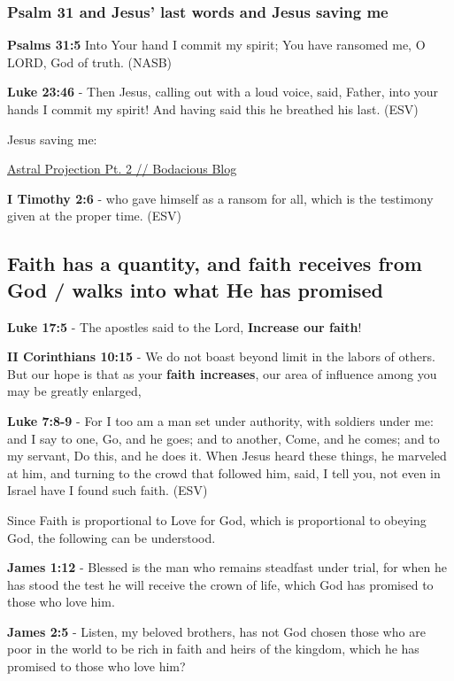 \documentclass[11pt]{article}
\begin{document}
\subsubsection{Psalm 31 and Jesus' last words and Jesus saving me}
\label{sec:org4863b66}

\textbf{Psalms 31:5}  Into Your hand I commit my spirit; You have ransomed me, O LORD, God of truth.  (NASB)

\textbf{Luke 23:46} - Then Jesus, calling out with a loud voice, said, Father, into your hands I commit my spirit! And having said this he breathed his last.  (ESV)

Jesus saving me:

\href{https://web.archive.org/web/20220402091720/https://mullikine.github.io/posts/astral-projection-pt-2/}{Astral Projection Pt. 2 // Bodacious Blog}

\textbf{I Timothy 2:6} - who gave himself as a ransom for all, which is the testimony given at the proper time. (ESV)

\subsection{Faith has a quantity, and faith receives from God / walks into what He has promised}
\label{sec:org058a643}
\textbf{Luke 17:5} - The apostles said to the Lord, \textbf{Increase our faith}!

\textbf{II Corinthians 10:15} - We do not boast beyond limit in the labors of others. But our hope is that as your \textbf{faith increases}, our area of influence among you may be greatly enlarged,

\textbf{Luke 7:8-9} - For I too am a man set under authority, with soldiers under me: and I say to one, Go, and he goes; and to another, Come, and he comes; and to my servant, Do this, and he does it. When Jesus heard these things, he marveled at him, and turning to the crowd that followed him, said, I tell you, not even in Israel have I found such faith. (ESV)

Since Faith is proportional to Love for God, which is proportional to obeying God, the following can be understood.

\textbf{James 1:12} - Blessed is the man who remains steadfast under trial, for when he has stood the test he will receive the crown of life, which God has promised to those who love him.

\textbf{James 2:5} - Listen, my beloved brothers, has not God chosen those who are poor in the world to be rich in faith and heirs of the kingdom, which he has promised to those who love him?
\end{document}
